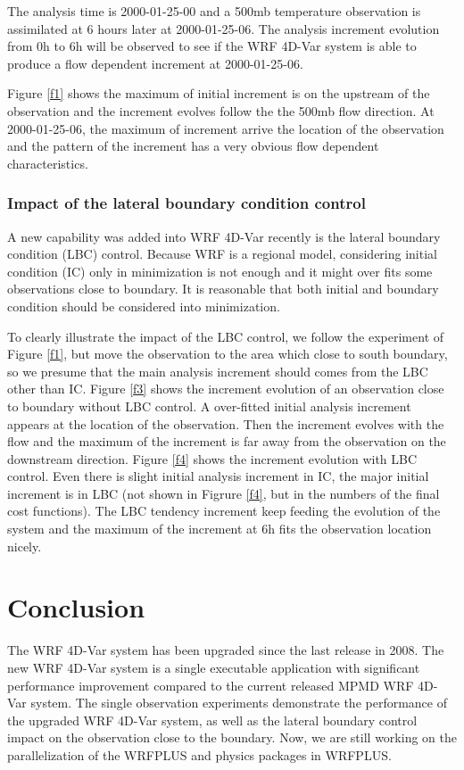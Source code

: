 \documentclass[12pt]{article}
\begin{document}
The analysis time is 2000-01-25-00 and a 500mb temperature observation is assimilated at 6 hours later at 2000-01-25-06. The analysis increment evolution from 0h to 6h will be observed to see if the WRF 4D-Var system is able to produce a flow dependent increment at 2000-01-25-06. 

Figure \ref{f1} shows the maximum of initial increment is on the upstream of the observation and the increment evolves follow the the 500mb flow direction. At 2000-01-25-06, the maximum of increment arrive the location of the observation and the pattern of the increment has a very obvious flow dependent characteristics.

\subsubsection{Impact of the lateral boundary condition control}

A new capability was added into WRF 4D-Var recently is the lateral boundary condition (LBC) control. Because WRF is a regional model, considering initial condition (IC) only in minimization is not enough and it might over fits some observations close to boundary. It is reasonable that both initial and boundary condition should be considered into minimization.

To clearly illustrate the impact of the LBC control, we follow the experiment of Figure \ref{f1}, but move the observation to the area which close to south boundary, so we presume that the main analysis increment should comes from  the LBC other than IC. Figure \ref{f3} shows the increment evolution of an observation close to boundary without LBC control. A over-fitted initial analysis increment appears at the location of the observation. Then the increment evolves with the flow and the maximum of the increment is far away from the observation on the downstream direction. Figure \ref{f4} shows the increment evolution with LBC control. Even there is slight initial analysis increment in IC, the major initial increment is in LBC (not shown in Figrure \ref{f4}, but in the numbers of the final cost functions). The LBC tendency increment keep feeding the evolution of the system and the maximum of the increment at 6h fits the observation location nicely.

\section{Conclusion}

The WRF 4D-Var system has been upgraded since the last release in 2008. The new WRF 4D-Var system is a single executable application with significant performance improvement compared to the current released MPMD WRF 4D-Var system. The single observation experiments demonstrate the performance of the upgraded WRF 4D-Var system, as well as the lateral boundary control impact on the observation close to the boundary. Now, we are still working on the parallelization of the WRFPLUS and physics packages in WRFPLUS.
\end{document}
